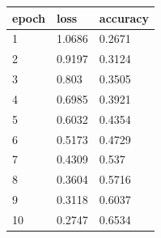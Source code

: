 \begin{tabular}{lll}
\hline
epoch & loss & accuracy \\
\hline
1 & 1.0686 & 0.2671 \\
2 & 0.9197 & 0.3124 \\
3 & 0.803 & 0.3505 \\
4 & 0.6985 & 0.3921 \\
5 & 0.6032 & 0.4354 \\
6 & 0.5173 & 0.4729 \\
7 & 0.4309 & 0.537 \\
8 & 0.3604 & 0.5716 \\
9 & 0.3118 & 0.6037 \\
10 & 0.2747 & 0.6534 \\
\hline
\end{tabular}
